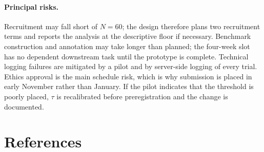 \documentclass[oneside,final,14pt,a4paper]{extreport}
\begin{document}
\paragraph{Principal risks.}
Recruitment may fall short of $N=60$; the design therefore plans two
recruitment terms and reports the analysis at the descriptive floor if
necessary. Benchmark construction and annotation may take longer than planned;
the four-week slot has no dependent downstream task until the prototype is
complete. Technical logging failures are mitigated by a pilot and by
server-side logging of every trial. Ethics approval is the main schedule risk,
which is why submission is placed in early November rather than January. If the
pilot indicates that the threshold is poorly placed, $\tau$ is recalibrated
before preregistration and the change is documented.

\section{References}
\printbibliography[heading=none]
\end{document}

